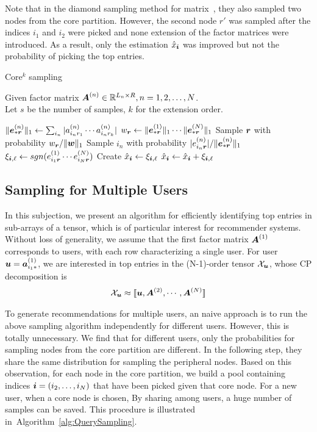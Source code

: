 \documentclass[10pt,journal,compsoc]{IEEEtran}
\newcommand{\Sca}[3]{{#1}^{(#2)}_{i_#2#3}}%
\newcommand{\anr}[2]{\Sca{a}{#1}{#2}}
\newcommand{\enr}[2]{\Sca{e}{#1}{\V{#2}}}
\newcommand{\score}[1]{\xi_{\V{i},#1}}
\newcommand{\T}[1]{\mathcal{#1}}
\newcommand{\KT}[1]{\llbracket #1 \rrbracket}
\newcommand{\V}[1]{{\boldsymbol{{\MakeLowercase{#1}}}}}
\newcommand{\ColVec}[3]{\V{#1}^{(#2)}_{#3}}
\newcommand{\NormColE}[2]{\norm{\ColVec{e}{#1}{*\V{#2}}}{1}}
\newcommand{\RowVecA}[1]{\V{a}^{(#1)}_{i_#1*}}
\newcommand{\coord}{(i_1,i_2,\ldots,i_N)}
\newcommand{\predx}{\hat{x}_{\V{i}}}
\newcommand{\M}[1]{{\boldsymbol{{\MakeUppercase{#1}}}}}
\newcommand{\FacMat}[2]{\M{#1}^{(#2)}}
\newcommand{\norm}[2]{\|#1\|_{#2}}
\newcommand{\Alg}[1]{Algorithm~\ref{alg:#1}}
\begin{document}
Note that in the diamond sampling method for matrix~\cite{BaPiKoSe15},
they also sampled two nodes from the core partition.
However, the second node $r'$ was sampled after the indices $i_1$ and $i_2$ were picked
and none extension of the factor matrices were introduced.
As a result, only the estimation $\predx$ was improved
but not the probability of picking the top entries.

\begin{algorithm}[!ht]
	\caption{Core$^k$ sampling}
	\label{alg:CoreExtensionSampling}
	Given factor matrix $\FacMat{A}{n}\in \mathbb{R}^{L_n\times R}, n = 1,2,\ldots,N$.\\
	Let $s$ be the number of samples, $k$ for the extension order.
	\begin{algorithmic}[1]
		\For{$\V{r}\in{\underbrace{R\times \cdots \times R}_{k}}$}
		\State $\NormColE{n}{r} \leftarrow \sum_{i_n}|\anr{n}{r_1}\cdots\anr{n}{r_k}|$
		\EndFor
		\State $w_{\V{r}} \leftarrow \NormColE{1}{r} \cdots \NormColE{N}{r} $
		\EndFor
		\State Sample $\V{r}$ with probability $w_\V{r}/\norm{\V{W}}{1}$
		\label{line:nodes}
		\State Sample $i_n$ with probability $|\enr{n}{r}|/\NormColE{n}{r}$
		\EndFor
		\State
		$\score{\ell} \leftarrow sgn(\enr{1}{r}\cdots\enr{N}{r})$
		\If {$\V{i}=\coord$ has not been sampled}
		\State  Create $\predx \leftarrow \score{\ell} $
		\Else
		\State $\predx \leftarrow \predx + \score{\ell}$
		\EndIf
		\EndFor
	\end{algorithmic}
\end{algorithm}

\subsection{Sampling for Multiple Users}
In this subjection,
we present an algorithm for efficiently identifying top entries in sub-arrays of a tensor,
which is of particular interest for recommender systems.
Without loss of generality,
we assume that the first factor matrix $\FacMat{A}{1}$ corresponds to users,
with each row characterizing a single user.
For user $\V{u} = \RowVecA{1}$,
we are interested in top entries in the (N-1)-order tensor $\T{X}_\V{u}$,
whose CP decomposition is
\begin{align}
\T{X}_{\V{u}} \approx \KT{\V{u},\FacMat{A}{2},\cdots,\FacMat{A}{N}}
\end{align}

To generate recommendations for multiple users,
an naive approach is to run the above sampling algorithm independently for different users.
However, this is totally unnecessary.
We find that for different users,
only the probabilities for sampling nodes from the core partition are different.
In the following step, they share the same distribution for sampling the peripheral nodes.
Based on this observation, for each node in the core partition,
we build a pool containing indices $\V{i}=(i_2,\ldots,i_N)$ that have been picked given that core node.
For a new user, when a core node is chosen,
By sharing among users, a huge number of samples can be saved.
This procedure is illustrated in~\Alg{QuerySampling}.
\end{document}
